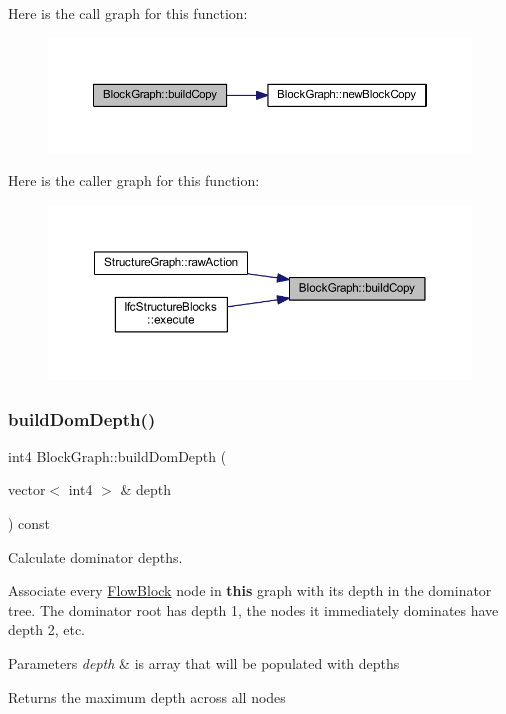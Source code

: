 Here is the call graph for this function\+:
\nopagebreak
\begin{figure}[H]
\begin{center}
\leavevmode
\includegraphics[width=350pt]{class_block_graph_a85422522e8c61496c5253f410f140fcc_cgraph}
\end{center}
\end{figure}
Here is the caller graph for this function\+:
\nopagebreak
\begin{figure}[H]
\begin{center}
\leavevmode
\includegraphics[width=350pt]{class_block_graph_a85422522e8c61496c5253f410f140fcc_icgraph}
\end{center}
\end{figure}
\mbox{\label{class_block_graph_afc33c821dd221280e2d73d24011a5aa7}} 
\subsubsection{\texorpdfstring{buildDomDepth()}{buildDomDepth()}}
{\footnotesize\ttfamily int4 Block\+Graph\+::build\+Dom\+Depth (\begin{DoxyParamCaption}\item[{vector$<$ int4 $>$ \&}]{depth }\end{DoxyParamCaption}) const}



Calculate dominator depths. 

Associate every \mbox{\hyperlink{class_flow_block}{Flow\+Block}} node in {\bfseries{this}} graph with its depth in the dominator tree. The dominator root has depth 1, the nodes it immediately dominates have depth 2, etc. 
\begin{DoxyParams}{Parameters}
{\em depth} & is array that will be populated with depths \\
\hline
\end{DoxyParams}
\begin{DoxyReturn}{Returns}
the maximum depth across all nodes 
\end{DoxyReturn}


